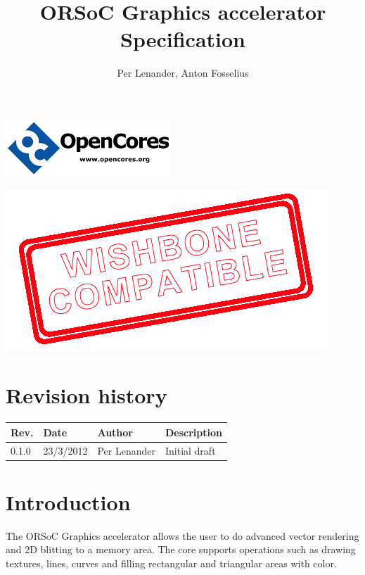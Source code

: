 \documentclass[10pt,a4paper]{article}
\author{Per Lenander, Anton Fosselius}
\title{ORSoC Graphics accelerator Specification}
\begin{document}
\maketitle

\begin{center}
\includegraphics[scale=1.0]{../pictures/OpenCores}
\end{center}

\begin{center}
\includegraphics[scale=0.50]{../pictures/wb_compatible}
\end{center}

\newpage

\section*{Revision history}
\begin{tabular}{|p{1cm}|p{2cm}|p{3cm}|p{7cm}|}
\hline \textbf{Rev.} & \textbf{Date} & \textbf{Author} & \textbf{Description} \\
\hline 
\hline 0.1.0 & 23/3/2012 & Per Lenander & Initial draft \\
\hline 
\end{tabular} 
\newpage

\tableofcontents
\newpage

\section{Introduction}
The ORSoC Graphics accelerator allows the user to do advanced vector rendering and 2D blitting to a memory area. The core supports operations such as drawing textures, lines, curves and filling rectangular and triangular areas with color.
\end{document}
